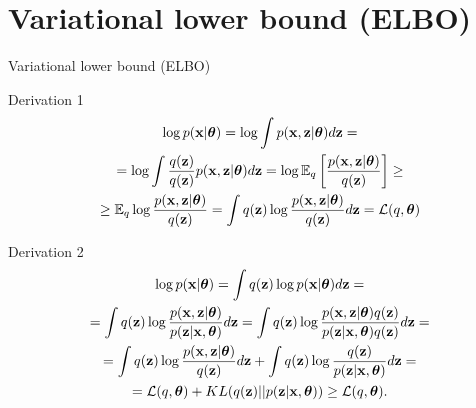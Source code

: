 \section{Variational lower bound (ELBO)}
\begin{frame}{Variational lower bound (ELBO)}
	\begin{block}{Derivation 1}
		\vspace{-0.7cm}
		\begin{multline*}
			\log p(\bx| \btheta) 
			= \log \int p(\bx, \bz | \btheta) d\bz = \\ 
			= \log \int \frac{q(\bz)}{q(\bz)} p(\bx, \bz | \btheta) d\bz
			= \log \bbE_{q} \left[\frac{p(\bx, \bz| \btheta)}{q(\bz)} \right] \geq \\
			\geq \bbE_{q} \log \frac{p(\bx, \bz| \btheta)}{q(\bz)} = \int q(\bz) \log \frac{p(\bx, \bz| \btheta)}{q(\bz)} d \bz = \cL(q, \btheta)
		\end{multline*}
		\vspace{-0.7cm}
	\end{block}
	\begin{block}{Derivation 2}
		\vspace{-0.7cm}
		\begin{multline*}
			\log p(\bx| \btheta) 
			= \int q(\bz) \log p(\bx| \btheta) d\bz = \\ 
			= \int q(\bz) \log \frac{p(\bx, \bz| \btheta)}{p(\bz|\bx, \btheta)}d\bz
			= \int q(\bz) \log \frac{p(\bx, \bz| \btheta) q(\bz)}{p(\bz|\bx, \btheta) q(\bz)} d\bz = \\
			= \int q(\bz) \log \frac{p(\bx, \bz | \btheta)}{q(\bz)}d\bz + \int q(\bz) \log \frac{q(\bz)}{p(\bz|\bx, \btheta)}d\bz = \\ 
			= \mathcal{L} (q, \btheta) + KL(q(\bz) || p(\bz|\bx, \btheta)) \geq \mathcal{L} (q, \btheta).
		\end{multline*}
		\vspace{-0.7cm}
	\end{block}
\end{frame}
